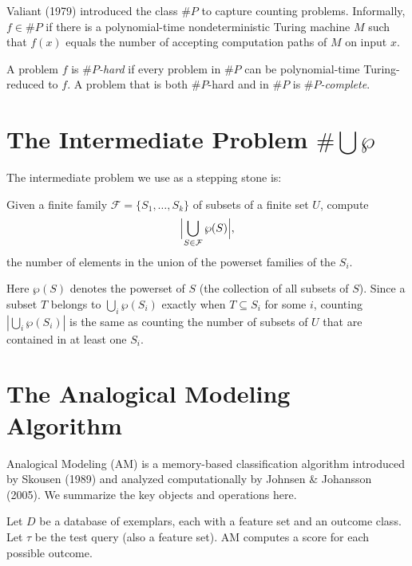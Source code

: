 Valiant (1979) introduced the class $\#P$ to capture counting problems.
Informally, $f \in \#P$ if there is a polynomial-time nondeterministic Turing
machine $M$ such that $f(x)$ equals the number of accepting computation paths
of $M$ on input $x$.

A problem $f$ is $\#P$\emph{-hard} if every problem in $\#P$ can be
polynomial-time Turing-reduced to $f$.  A problem that is both $\#P$-hard and
in $\#P$ is $\#P$\emph{-complete}.

\section{The Intermediate Problem \texorpdfstring{$\#\bigcup\wp$}{\#UnionPowersets}}

The intermediate problem we use as a stepping stone is:

\begin{definition}[$\#\bigcup\wp$]
  \label{def:count-union-powersets}
  Given a finite family $\mathcal{F} = \{S_1, \ldots, S_k\}$ of subsets of a
  finite set $U$, compute
  \[
    \Bigl|\bigcup_{S \in \mathcal{F}} \wp(S)\Bigr|,
  \]
  the number of elements in the union of the powerset families of the $S_i$.
\end{definition}

Here $\wp(S)$ denotes the powerset of $S$ (the collection of all subsets of
$S$).  Since a subset $T$ belongs to $\bigcup_i \wp(S_i)$ exactly when $T
\subseteq S_i$ for some $i$, counting $|\bigcup_i \wp(S_i)|$ is the same as
counting the number of subsets of $U$ that are contained in at least one $S_i$.

\section{The Analogical Modeling Algorithm}

Analogical Modeling (AM) is a memory-based classification algorithm introduced
by Skousen (1989) and analyzed computationally by Johnsen \& Johansson (2005).
We summarize the key objects and operations here.

Let $D$ be a database of exemplars, each with a feature set and an outcome
class.  Let $\tau$ be the test query (also a feature set).  AM computes a
score for each possible outcome.

